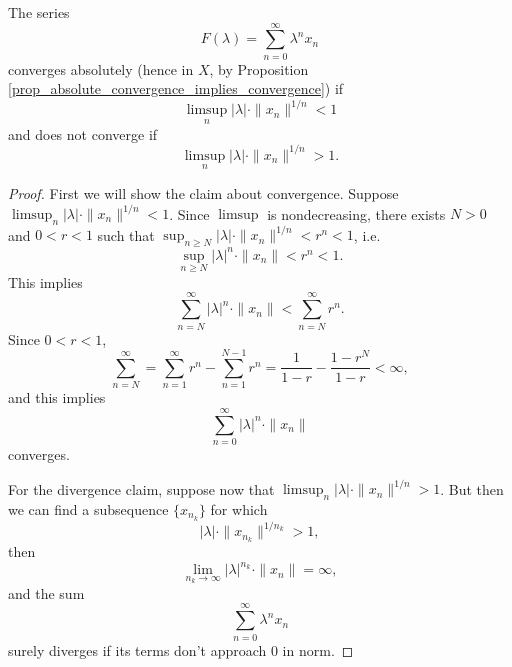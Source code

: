 \documentclass[12pt]{article}
\begin{document}
\begin{refsection}
\begin{theorem}
\label{thm_radius_of_convergence}
	The series
	\begin{equation*}
		F(\lambda) = \sum_{n=0}^\infty \lambda^n x_n
	\end{equation*}
	converges absolutely (hence in $X$, by Proposition \ref{prop_absolute_convergence_implies_convergence}) if 
	\begin{equation*}
		\limsup_n |\lambda| \cdot \|x_n\|^{1/n} < 1
	\end{equation*}
	and does not converge if 
	\begin{equation*}
		\limsup_n |\lambda| \cdot \|x_n\|^{1/n} > 1.
	\end{equation*}
\end{theorem}
\begin{proof}
	First we will show the claim about convergence. Suppose $\limsup_n |\lambda|\cdot\|x_n\|^{1/n} < 1$. Since $\limsup$ is nondecreasing, there exists $N>0$ and $0<r<1$ such that $\sup_{n\geq N} |\lambda| \cdot \|x_n\|^{1/n} < r^n < 1$, i.e.
	\begin{equation*}
		\sup_{n\geq N} |\lambda|^n \cdot \|x_n\| < r^{n} < 1.
	\end{equation*}
	This implies
	\begin{equation*}
		\sum_{n=N}^\infty |\lambda|^n \cdot \|x_n\| < \sum_{n=N}^\infty r^n.
	\end{equation*}
	Since $0<r<1$, 
	\begin{equation*}
		\sum_{n=N}^\infty = \sum_{n=1}^\infty r^n - \sum_{n=1}^{N-1} r^n = \frac{1}{1-r} - \frac{1-r^N}{1-r} < \infty, 
	\end{equation*}
	and this implies
	\begin{equation*}
		\sum_{n=0}^\infty |\lambda|^n \cdot \|x_n\| 
	\end{equation*}
	converges.
	
	For the divergence claim, suppose now that $\limsup_n |\lambda| \cdot \|x_n\|^{1/n} > 1$. But then we can find a subsequence $\{x_{n_k}\}$ for which 
	\begin{equation*}
		|\lambda| \cdot \|x_{n_k}\|^{1/n_k} > 1,
	\end{equation*}
	then
	\begin{equation*}
		\lim_{n_k\to\infty} |\lambda|^{n_k} \cdot \|x_n\| = \infty,
	\end{equation*}
	and the sum
	\begin{equation*}
		\sum_{n=0}^\infty \lambda^n x_n
	\end{equation*}
	surely diverges if its terms don't approach 0 in norm.
\end{proof}


\end{refsection}
\end{document}

